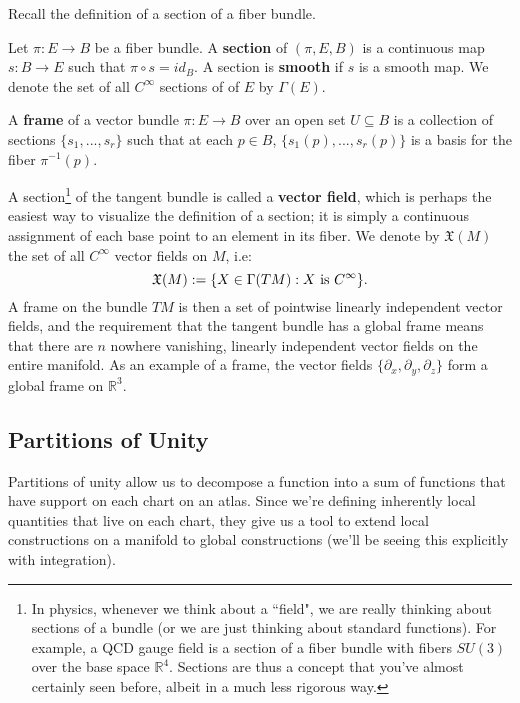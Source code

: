 Recall the definition of a section of a fiber bundle.
\begin{definition}[Section]
	Let $\pi : E\rightarrow B$ be a fiber bundle. A \textbf{section} of $(\pi, E, B)$ is a continuous map $s : B\rightarrow E$ 
	such that $\pi\circ s = id_B$. A section is \textbf{smooth} if $s$ is a smooth map. We denote the set of all $C^\infty$ 
	sections of of $E$ by $\Gamma(E)$. 
\end{definition}
\begin{definition}[Frame]
	A \textbf{frame} of a vector bundle $\pi : E\rightarrow B$ over an open set $U\subseteq B$ is a collection of sections 
	$\{s_1, ..., s_r\}$ such that at each $p\in B$, $\{s_1(p), ..., s_r(p)\}$ is a basis for the fiber $\pi^{-1}(p)$. 
\end{definition}
A section\footnote{In physics, whenever we think about a ``field", we are really thinking about sections of a bundle (or we are 
just thinking about standard functions). For example, a QCD gauge field is a section of a fiber bundle with fibers $SU(3)$ over 
the base space $\mathbb R^4$. Sections are thus a concept that you've almost certainly seen before, albeit in a much less 
rigorous way.} of the tangent bundle is called a \textbf{vector field}, which is perhaps the easiest way to visualize the definition 
of a section; it is simply a continuous assignment of each base point to an element in its fiber. We denote by $\mathfrak X(M)$ 
the set of all $C^\infty$ vector fields on $M$, i.e: 
\begin{equation}
	\mathfrak X(M) := \{X\in \Gamma(TM) : X\textnormal{ is } C^\infty\}.
\end{equation}
A frame on the bundle 
$TM$ is then a set of pointwise linearly independent vector fields, and the requirement that the tangent bundle has a global 
frame means that there are $n$ nowhere vanishing, linearly independent vector fields on the entire manifold. As an 
example of a frame, the vector fields $\{\partial_x, \partial_y, \partial_z\}$ form a global frame on $\mathbb R^3$. 

\subsection{Partitions of Unity}

Partitions of unity allow us to decompose a function into a sum of functions that have support on each chart on an atlas. Since we're defining inherently local quantities that live on each chart, they give us a tool to extend local constructions on a manifold to global constructions (we'll be seeing this explicitly with integration). 

